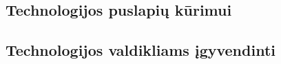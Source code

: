 \documentclass{VUMIFPSkursinis}
\begin{document}
\subsection{Technologijos puslapių kūrimui}

\subsection{Technologijos valdikliams įgyvendinti}





\printbibliography[heading=bibintoc, title=Šaltiniai]  %








\end{document}
